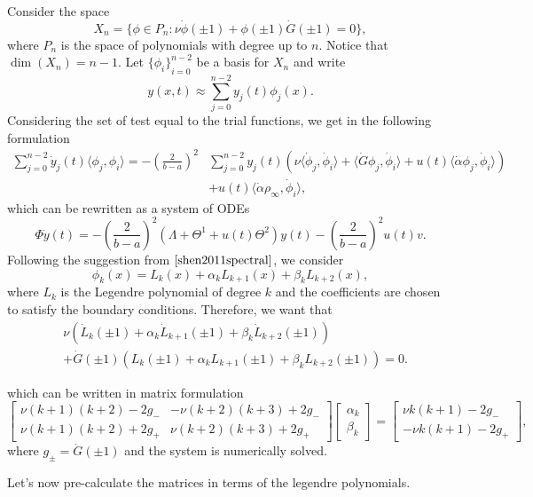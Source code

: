 \documentclass[12pt]{article}
\newcommand{\steady}{\rho_{\infty}}
\newcommand{\inner}[2]{\langle{} #1, #2 \rangle{}}
\theoremstyle{definition}
\begin{document}
Consider the space 
\[
X_n = \{\phi \in P_n : \nu \dot{\phi}(\pm 1) + \phi(\pm 1) \dot{G}(\pm 1) = 0\},
\]
where $P_n$ is the space of polynomials with degree up to $n$.
Notice that $\dim(X_n) = n-1$.
Let ${\{\phi_i\}}_{i=0}^{n-2}$ be a basis for $X_n$ and write 
\[
y(x,t) \approx \sum_{j=0}^{n-2} y_j(t) \phi_j(x). 
\]
Considering the set of test equal to the trial functions, we get in the following formulation
\[
\begin{split}
    \sum_{j=0}^{n-2} \dot{y}_j(t) \inner{\phi_j}{\phi_i} = -{\left(\frac{2}{b-a}\right)}^2 &\sum_{j=0}^{n-2} y_j(t) \left(\nu \inner{\dot{\phi}_j}{\dot{\phi}_i} + \inner{\dot{G} \phi_j}{\dot{\phi}_i} + u(t)\inner{\dot{\alpha}\phi_j}{\dot{\phi}_i} \right) \\ 
    &+ u(t) \inner{\dot{\alpha} \steady}{\dot{\phi}_i},
\end{split}
\]
which can be rewritten as a system of ODEs
\[
\Phi \dot{y}(t) = -{\left(\frac{2}{b-a}\right)}^2 (\Lambda + \Theta^1 + u(t)\Theta^2)y(t) - {\left(\frac{2}{b-a}\right)}^2u(t)v.    
\]
Following the suggestion from $\cite[p.7]{shen2011spectral}$, we consider
\[
\phi_k(x) = L_k(x) + \alpha_k L_{k+1}(x) + \beta_k L_{k+2}(x),    
\]
where $L_k$ is the Legendre polynomial of degree $k$ and the coefficients are chosen to satisfy the boundary conditions. 
Therefore, we want that
\[
\begin{split}
    &\nu (\dot{L}_k(\pm 1) + \alpha_k \dot{L}_{k+1}(\pm 1) + \beta_k \dot{L}_{k+2}(\pm 1)) \\ 
    &+ \dot{G}(\pm 1)(L_k(\pm 1) + \alpha_k L_{k+1}(\pm 1) + \beta_k L_{k+2}(\pm 1)) = 0.
\end{split}
\]

which can be written in matrix formulation
\[
\begin{bmatrix}
    \nu (k+1)(k+2) - 2g_{-} & -\nu (k+2)(k+3) + 2g_- \\
    \nu (k+1)(k+2) + 2g_+ & \nu (k+2)(k+3) + 2g_+
\end{bmatrix}\begin{bmatrix}
    \alpha_k \\ \beta_k
\end{bmatrix} = \begin{bmatrix}
    \nu k(k+1) - 2g_- \\ -\nu k(k+1) - 2g_+
\end{bmatrix},
\]
where $g_{\pm} = \dot{G}(\pm 1)$ and the system is numerically solved.

Let's now pre-calculate the matrices in terms of the legendre polynomials.
\end{document}
